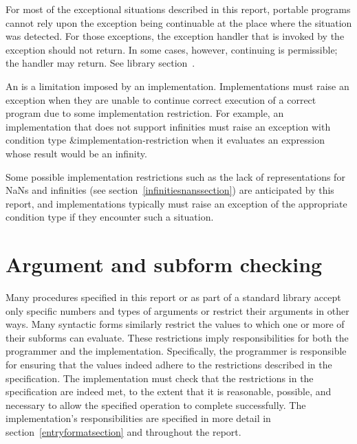 For most of the exceptional situations described in this report,
portable programs cannot rely upon the exception being continuable
at the place where the situation was detected.
For those exceptions, the exception handler that is invoked by the
exception should not return.
In some cases, however, continuing is permissible; the
handler may return.  See library section~.

An  is a limitation imposed by an
implementation.  Implementations must raise an exception
when they are unable to continue correct execution
of a correct program due to some implementation restriction.  For
example, an implementation that does not support infinities
must raise an exception with condition type
{\cf\&implementation-restriction} when it evaluates an expression
whose result would be an infinity.

Some possible implementation restrictions such as the lack of
representations for NaNs and infinities (see
section~\ref{infinitiesnanssection}) are anticipated by this report,
and implementations typically must raise an exception of the
appropriate condition type if they encounter such a situation.

\section{Argument and subform checking}
\label{argumentcheckingsection}

Many procedures specified in this report or as part of a
standard library accept only specific numbers and types of arguments
or restrict their arguments in other ways.
Many syntactic forms similarly restrict the values to which one or
more of their subforms can evaluate.
These restrictions imply responsibilities for
both the programmer and the implementation.
Specifically, the programmer is responsible for ensuring
that the values indeed adhere to the restrictions described
in the specification.  The implementation must check
that the restrictions in the specification are indeed met, to the
extent that it is reasonable, possible, and necessary to allow the
specified operation to complete successfully.  The implementation's
responsibilities are specified in more detail in
section~\ref{entryformatsection} and throughout the report.

